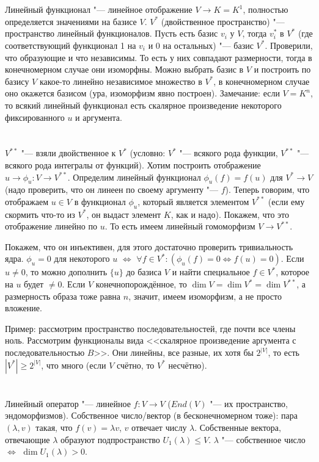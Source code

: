 \section{} %
Линейный функционал "--- линейное отображение $V \to K = K^1$, полностью определяется значениями на базисе $V$.
$V^*$ (двойственное пространство) "--- пространство линейный функционалов.
Пусть есть базис $v_i$ у $V$, тогда $v_i^*$ в $V^*$ (где соответствующий функционал 1 на $v_i$ и 0 на остальных) "--- базис $V^*$.
Проверили, что образующие и что независимы.
То есть у них совпадают размерности, тогда в конечномерном случае они изоморфны.
Можно выбрать базис в $V$ и построить по базису $V$ какое-то линейно независимое множество в $V^*$, в конечномерном случае оно окажется базисом (ура, изоморфизм явно построен).
Замечание: если $V=K^n$, то всякий линейный функционал есть скалярное произведение некоторого фиксированного $u$ и аргумента.

\section{} %
$V^{**}$ "--- взяли двойственное к $V^*$ (условно: $V^*$ "--- всякого рода функции, $V^{**}$ "--- всякого рода интегралы от функций).
Хотим построить отображение $u \to \phi_u \colon V \to V^{**}$.
Определим линейный функционал $\phi_u(f)=f(u)$ для $V^* \to V$ (надо проверить, что он линеен по своему аргументу "--- $f$).
Теперь говорим, что отображаем $u \in V$ в функционал $\phi_u$, который является элементом $V^{**}$ (если ему скормить что-то из $V^*$, он выдаст элемент $K$, как и надо).
Покажем, что это отображение линейно по $u$.
То есть имеем линейный гомоморфизм $V \to V^{**}$.

Покажем, что он инъективен, для этого достаточно проверить тривиальность ядра.
$\phi_u = 0$ для некоторого $u$ $\iff$ $\forall f \in V^* \colon (\phi_u(f) = 0 \iff f(u)=0)$.
Если $u \neq 0$, то можно дополнить $\{ u \}$ до базиса $V$ и найти специальное $f \in V^*$, которое на $u$ будет $\neq 0$.
Если $V$ конечнопорождённое, то $\dim V = \dim V^* = \dim V^{**}$, а размерность образа тоже равна $n$, значит, имеем изоморфизм, а не просто вложение.

Пример: рассмотрим пространство последовательностей, где почти все члены ноль.
Рассмотрим функционалы вида <<скалярное произведение аргумента с последовательностью $B$>>.
Они линейны, все разные, их хотя бы $2^{|V|}$, то есть $|V^*|\ge2^{|V|}$, что много (если $V$ счётно, то $V^*$ несчётно).

\section{} %
Линейный оператор "--- линейное $f \colon V \to V$ ($End(V)$ "--- их пространство, эндоморфизмов).
Собственное число/вектор (в бесконечномерном тоже): пара $(\lambda, v)$ такая, что $f(v)=\lambda v$, $v$ отвечает числу $\lambda$.
Собственные вектора, отвечающие $\lambda$ образуют подпространство $U_1(\lambda) \le V$.
$\lambda$ "--- собственное число $\iff$ $\dim U_1(\lambda) > 0$.

